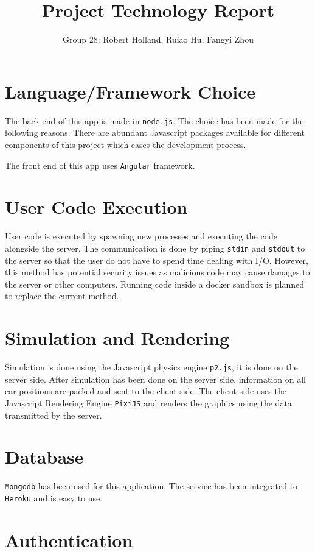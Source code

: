\documentclass[a4paper]{article}
\title{Project Technology Report}
\author{Group 28: Robert Holland, Ruiao Hu, Fangyi Zhou}
\begin{document}
\maketitle

\section{Language/Framework Choice}

The back end of this app is made in \texttt{node.js}. The choice has been made
for the following reasons. There are abundant Javascript packages available for
different components of this project which eases the development process.

The front end of this app uses \texttt{Angular} framework.

\section{User Code Execution}

User code is executed by spawning new processes and executing the code
alongside the server. The communication is done by piping \texttt{stdin} and
\texttt{stdout} to the server so that the user do not have to spend time
dealing with I/O. However, this method has potential security issues as
malicious code may cause damages to the server or other computers. Running code
inside a docker sandbox is planned to replace the current method.

\section{Simulation and Rendering}

Simulation is done using the Javascript physics engine \texttt{p2.js}, it is
done on the server side.
After simulation has been done on the server side, information on all car
positions are packed and sent to the client side. The client side uses the
Javascript Rendering Engine \texttt{PixiJS} and renders the graphics using the
data transmitted by the server.

\section{Database}

\texttt{Mongodb} has been used for this application. The service has been
integrated to \texttt{Heroku} and is easy to use.

\section{Authentication}
\end{document}
